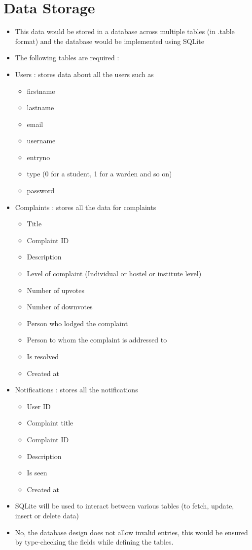 \documentclass[12pt]{article}
\begin{document}
\section{Data Storage}
\begin{itemize}
\item This data would be stored in a database across multiple tables (in .table format) and the database would be implemented using SQLite
\item The following tables are required :
\item Users : stores data about all the users such as 
	\begin{itemize}
		\color{blue}
		\item firstname
		\item lastname
		\item email
		\item username
		\item entryno
		\item type (0 for a student, 1 for a warden and so on)
		\item password
	\end{itemize}
\item Complaints : stores all the data for complaints
	\begin{itemize}
		\color{blue}
		\item Title
		\item Complaint ID
		\item Description
		\item Level of complaint (Individual or hostel or institute level)
		\item Number of upvotes
		\item Number of downvotes
		\item Person who lodged the complaint
		\item Person to whom the complaint is addressed to
		\item Is resolved
		\item Created at
	\end{itemize}
\item Notifications : stores all the notifications
	\begin{itemize}
		\color{blue}
		\item User ID
		\item Complaint title
		\item Complaint ID
		\item Description
		\item Is seen
		\item Created at
	\end{itemize}
\item SQLite will be used to interact between various tables (to fetch, update, insert or delete data)
\item No, the database design does not allow invalid entries, this would be ensured by type-checking the fields while defining the tables. 
\end{itemize}
\end{document}
